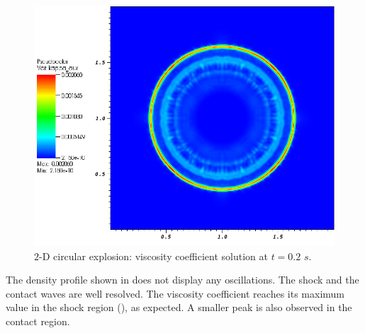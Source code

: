%
\begin{figure}[H]
\centering
\includegraphics[width=\textwidth]{figures/Explosion_viscosity_profiles.png}
\caption{$2$-D circular explosion: viscosity coefficient solution at $t=0.2$ $s$.}
\label{fig:2d_explosion_visc_sct3}
\end{figure}
%
The density profile shown in  does not display any oscillations. The shock and the contact waves are well resolved. The viscosity coefficient reaches its maximum value in the shock region (), as expected. A smaller peak is also observed in the contact region. 
